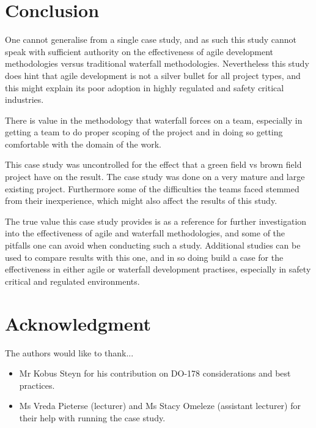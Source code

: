\documentclass{sig-alternate-05-2015}
\begin{document}
\section{Conclusion}
One cannot generalise from a single case study, and as such this study cannot speak with sufficient authority on the effectiveness of agile development methodologies versus traditional waterfall methodologies. Nevertheless this study does hint that agile development is not a silver bullet for all project types, and this might explain its poor adoption in highly regulated and safety critical industries. 

There is value in the methodology that waterfall forces on a team, especially in getting a team to do proper scoping of the project and in doing so getting comfortable with the domain of the work.

This case study was uncontrolled for the effect that a green field vs brown field project have on the result. The case study was done on a very mature and large existing project. Furthermore some of the difficulties the teams faced stemmed from their inexperience, which might also affect the results of this study. 

The true value this case study provides is as a reference for further investigation into the effectiveness of agile and waterfall methodologies, and some of the pitfalls one can avoid when conducting such a study. Additional studies can be used to compare results with this one, and in so doing build a case for the effectiveness in either agile or waterfall development practises, especially in safety critical and regulated environments. 



\section*{Acknowledgment}


The authors would like to thank...

\begin{itemize}
	\item Mr Kobus Steyn for his contribution on DO-178 considerations and best practices.
	\item Ms Vreda Pieterse (lecturer) and Ms Stacy Omeleze (assistant lecturer) for their help with running the case study.
\end{itemize}
\end{document}

